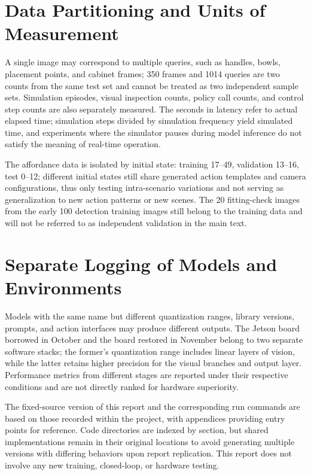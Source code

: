 \section{Data Partitioning and Units of Measurement}
A single image may correspond to multiple queries, such as handles, bowls, placement points, and cabinet frames; 350 frames and 1014 queries are two counts from the same test set and cannot be treated as two independent sample sets. Simulation episodes, visual inspection counts, policy call counts, and control step counts are also separately measured. The seconds in latency refer to actual elapsed time; simulation steps divided by simulation frequency yield simulated time, and experiments where the simulator pauses during model inference do not satisfy the meaning of real-time operation.

The affordance data is isolated by initial state: training 17--49, validation 13--16, test 0--12; different initial states still share generated action templates and camera configurations, thus only testing intra-scenario variations and not serving as generalization to new action patterns or new scenes. The 20 fitting-check images from the early 100 detection training images still belong to the training data and will not be referred to as independent validation in the main text.
\section{Separate Logging of Models and Environments}
Models with the same name but different quantization ranges, library versions, prompts, and action interfaces may produce different outputs. The Jetson board borrowed in October and the board restored in November belong to two separate software stacks; the former's quantization range includes linear layers of vision, while the latter retains higher precision for the visual branches and output layer. Performance metrics from different stages are reported under their respective conditions and are not directly ranked for hardware superiority.

The fixed-source version of this report and the corresponding run commands are based on those recorded within the project, with appendices providing entry points for reference. Code directories are indexed by section, but shared implementations remain in their original locations to avoid generating multiple versions with differing behaviors upon report replication. This report does not involve any new training, closed-loop, or hardware testing.
